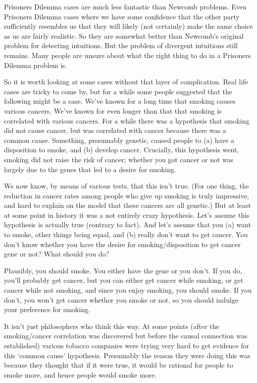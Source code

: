 Prisoners Dilemma cases are much less fantastic than Newcomb problems. Even Prisoners Dilemma cases where we have some confidence that the other party sufficiently resembles us that they will likely (not certainly) make the same choice as us are fairly realistic. So they are somewhat better than Newcomb's original problem for detecting intuitions. But the problem of divergent intuitions still remains. Many people are unsure about what the right thing to do in a Prisoners Dilemma problem is. 

So it is worth looking at some cases without that layer of complication. Real life cases are tricky to come by, but for a while some people suggested that the following might be a case. We've known for a long time that smoking causes various cancers. We've known for even longer than that that smoking is correlated with various cancers. For a while there was a hypothesis that smoking did not cause cancer, but was correlated with cancer because there was a common cause. Something, presumably genetic, caused people to (a) have a disposition to smoke, and (b) develop cancer. Crucially, this hypothesis went, smoking did not raise the risk of cancer; whether you got cancer or not was largely due to the genes that led to a desire for smoking.

We now know, by means of various tests, that this isn't true. (For one thing, the reduction in cancer rates among people who give up smoking is truly impressive, and hard to explain on the model that these cancers are all genetic.) But at least at some point in history it was a not entirely crazy hypothesis. Let's assume this hypothesis is actually true (contrary to fact). And let's assume that you (a) want to smoke, other things being equal, and (b) really don't want to get cancer. You don't know whether you have the desire for smoking/disposition to get cancer gene or not? What should you do?

Plausibly, you should smoke. You either have the gene or you don't. If you do, you'll probably get cancer, but you can either get cancer while smoking, or get cancer while not smoking, and since you enjoy smoking, you should smoke. If you don't, you won't get cancer whether you smoke or not, so you should indulge your preference for smoking.

It isn't just philosophers who think this way. At some points (after the smoking/cancer correlation was discovered but before the causal connection was established) various tobacco companies were trying very hard to get evidence for this `common cause' hypothesis. Presumably the reason they were doing this was because they thought that if it were true, it would be rational for people to smoke more, and hence people would smoke more.

